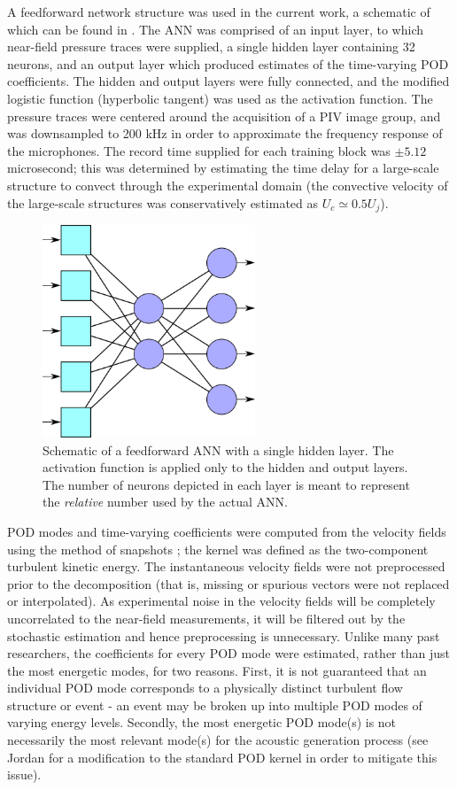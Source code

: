 A feedforward network structure was used in the current work, a schematic of which can be found in .
The ANN was comprised of an input layer, to which near-field pressure traces were supplied, a single hidden layer containing 32 neurons, and an output layer which produced estimates of the time-varying POD coefficients. 
The hidden and output layers were fully connected, and the modified logistic function (hyperbolic tangent) was used as the activation function.
The pressure traces were centered around the acquisition of a PIV image group, and was downsampled to 200 kHz in order to approximate the frequency response of the microphones.
The record time supplied for each training block was $\pm 5.12$ microsecond; this was determined by estimating the time delay for a large-scale structure to convect through the experimental domain (the convective velocity of the large-scale structures was conservatively estimated as $U_c \simeq 0.5 U_j$).
\begin{figure}
	\centering
	\includegraphics[width = 2.5in]{Figures/neural_net_v2.png}
	\caption{Schematic of a feedforward ANN with a single hidden layer. The activation function is applied only to the hidden and output layers. The number of neurons depicted in each layer is meant to represent the \textit{relative} number used by the actual ANN.}
	\label{fig:ch4_neural_net}
\end{figure} 

POD modes and time-varying coefficients were computed from the velocity fields using the method of snapshots \citep{Sirovich1987}; the kernel was defined as the two-component turbulent kinetic energy.
The instantaneous velocity fields were not preprocessed prior to the decomposition (that is, missing or spurious vectors were not replaced or interpolated).
As experimental noise in the velocity fields will be completely uncorrelated to the near-field measurements, it will be filtered out by the stochastic estimation and hence preprocessing is unnecessary.
Unlike many past researchers, the coefficients for every POD mode were estimated, rather than just the most energetic modes, for two reasons.
First, it is not guaranteed that an individual POD mode corresponds to a physically distinct turbulent flow structure or event - an event may be broken up into multiple POD modes of varying energy levels.
Secondly, the most energetic POD mode(s) is not necessarily the most relevant mode(s) for the acoustic generation process (see Jordan \etal \citep{Jordan2007} for a modification to the standard POD kernel in order to mitigate this issue). 

